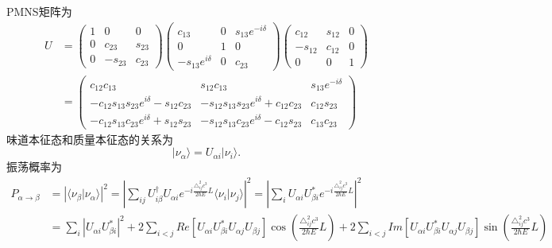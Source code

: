 			\begin{GCBox}[title = 三味混合]{}
				PMNS矩阵为
					\begin{equation}
						\begin{aligned}
							U
							&= \left(\begin{matrix}
								1 & 0 & 0\\
								0 & c_{23} & s_{23}\\
								0 & -s_{23} & c_{23}
							\end{matrix}\right)
							\left(\begin{matrix}
								c_{13} & 0 & s_{13}e^{-i\delta}\\
								0 & 1 & 0\\
								-s_{13}e^{i\delta} & 0 & c_{23}
							\end{matrix}\right)
							\left(\begin{matrix}
								c_{12} & s_{12} & 0\\
								-s_{12} & c_{12} & 0\\
								0 & 0 & 1
							\end{matrix}\right)\\
							&= \left(\begin{matrix}
								c_{12}c_{13} & s_{12}c_{13} & s_{13}e^{-i\delta}\\
								-c_{12}s_{13}s_{23}e^{i\delta} - s_{12}c_{23} & -s_{12}s_{13}s_{23}e^{i\delta} + c_{12}c_{23} & c_{12}s_{23}\\
								-c_{12}s_{13}c_{23}e^{i\delta} + s_{12}s_{23} & -s_{12}s_{13}c_{23}e^{i\delta} - c_{12}s_{23} & c_{13}c_{23}
							\end{matrix}\right)
						\end{aligned}
					\end{equation}
				味道本征态和质量本征态的关系为
					\begin{equation}
						|\nu_\alpha\rangle
						= U_{\alpha i}|\nu_i\rangle.
					\end{equation}
				振荡概率为
					\begin{equation}
						\begin{aligned}
							P_{\alpha\rightarrow\beta}
							&= \left|\langle\nu_\beta|\nu_\alpha\rangle\right|^2
							= \left|\sum_{ij}U^\dag_{i\beta}U_{\alpha i}e^{-i\frac{\triangle^2_{ij}c^3}{2\hbar E}L}\langle \nu_i|\nu_j\rangle\right|^2
							= \left|\sum_i U_{\alpha i}U_{\beta i}^*e^{-i\frac{\triangle^2_{ij}c^3}{2\hbar E}L}\right|^2\\
							&= \sum_i |U_{\alpha i}U_{\beta i}^*|^2 + 2\sum_{i < j}Re[U_{\alpha i}U_{\beta i}^*U_{\alpha j}U_{\beta j}]\cos\left(\frac{\triangle_{ij}^2c^3}{2\hbar E}L\right) + 2\sum_{i < j}Im[U_{\alpha i}U_{\beta i}^*U_{\alpha j}U_{\beta j}]\sin\left(\frac{\triangle_{ij}^2c^3}{2\hbar E}L\right)\\

\end{aligned}
\end{equation}
\end{GCBox}
